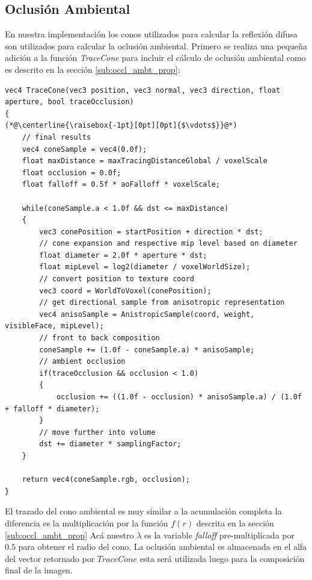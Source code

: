 \subsection{Oclusión Ambiental} %
\label{sub:oclusion_ambient}
En nuestra implementación los conos utilizados para calcular la reflexión difusa son utilizados para calcular la oclusión ambiental. Primero se realiza una pequeña adición a la función \emph{TraceCone} para incluir el cálculo de oclusión ambiental como es descrito en la sección \ref{sub:occl_ambt_prop}:
\\
\begin{lstlisting}[caption={Oclusión ambiental para el algoritmo de trazado de conos.}, label=Trace5]
vec4 TraceCone(vec3 position, vec3 normal, vec3 direction, float aperture, bool traceOcclusion)
{
(*@\centerline{\raisebox{-1pt}[0pt][0pt]{$\vdots$}}@*)
    // final results
    vec4 coneSample = vec4(0.0f);
    float maxDistance = maxTracingDistanceGlobal / voxelScale
   	float occlusion = 0.0f;
    float falloff = 0.5f * aoFalloff * voxelScale;

    while(coneSample.a < 1.0f && dst <= maxDistance)
    {
        vec3 conePosition = startPosition + direction * dst;
        // cone expansion and respective mip level based on diameter
        float diameter = 2.0f * aperture * dst;
        float mipLevel = log2(diameter / voxelWorldSize);
        // convert position to texture coord
        vec3 coord = WorldToVoxel(conePosition);
        // get directional sample from anisotropic representation
        vec4 anisoSample = AnistropicSample(coord, weight, visibleFace, mipLevel);
        // front to back composition
        coneSample += (1.0f - coneSample.a) * anisoSample;
        // ambient occlusion
        if(traceOcclusion && occlusion < 1.0)
        {
            occlusion += ((1.0f - occlusion) * anisoSample.a) / (1.0f + falloff * diameter);
        }
        // move further into volume
        dst += diameter * samplingFactor;
    }

    return vec4(coneSample.rgb, occlusion);
}
\end{lstlisting}
El trazado del cono ambiental es muy similar a la acumulación completa la diferencia es la multiplicación por la función $f(r)$ descrita en la sección \ref{sub:occl_ambt_prop} Acá nuestro $\lambda$ es la variable \emph{falloff} pre-multiplicada por $0.5$ para obtener el radio del cono. La oclusión ambiental es almacenada en el alfa del vector retornado por $TraceCone$ esta será utilizada luego para la composición final de la imagen.
